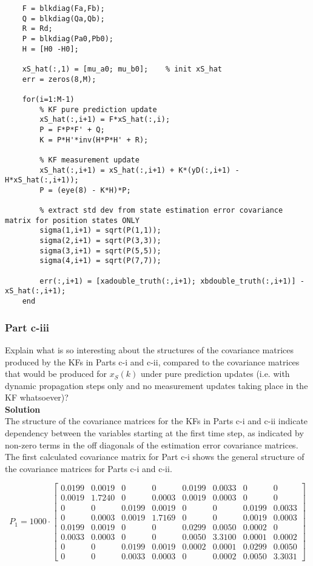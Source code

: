 \documentclass[]{article}
\begin{document}
\begin{lstlisting}
	F = blkdiag(Fa,Fb);
	Q = blkdiag(Qa,Qb);
	R = Rd;
	P = blkdiag(Pa0,Pb0);
	H = [H0 -H0];
	
	xS_hat(:,1) = [mu_a0; mu_b0];    % init xS_hat
	err = zeros(8,M);
	
	for(i=1:M-1)
		% KF pure prediction update
		xS_hat(:,i+1) = F*xS_hat(:,i);
		P = F*P*F' + Q;
		K = P*H'*inv(H*P*H' + R);
	
		% KF measurement update
		xS_hat(:,i+1) = xS_hat(:,i+1) + K*(yD(:,i+1) - H*xS_hat(:,i+1));
		P = (eye(8) - K*H)*P;
	
		% extract std dev from state estimation error covariance matrix for position states ONLY 
		sigma(1,i+1) = sqrt(P(1,1));
		sigma(2,i+1) = sqrt(P(3,3));
		sigma(3,i+1) = sqrt(P(5,5));
		sigma(4,i+1) = sqrt(P(7,7));
	
		err(:,i+1) = [xadouble_truth(:,i+1); xbdouble_truth(:,i+1)] - xS_hat(:,i+1);
	end
\end{lstlisting}

\subsubsection*{Part c-iii}

Explain what is so interesting about the structures of the covariance matrices produced by the KFs in Parts c-i and c-ii, compared to the covariance matrices that would be produced for $x_S(k)$ under pure prediction updates (i.e. with dynamic propagation steps only and no measurement updates taking place in the KF whatsoever)?\\

\noindent\textbf{Solution}\\

\noindent The structure of the covariance matrices for the KFs in Parts c-i and c-ii indicate dependency between the variables starting at the first time step, as indicated by non-zero terms in the off diagonals of the estimation error covariance matrices. The first calculated covariance matrix for Part c-i shows the general structure of the covariance matrices for Parts c-i and c-ii.

$$
P_1=1000\cdot\left[
\begin{array}{cccccccc}
0.0199  &  0.0019  &  0  &  0  &  0.0199  &  0.0033  &  0  &  0\\
0.0019  &  1.7240  & 0  &  0.0003  &  0.0019  &  0.0003  & 0  & 0\\
0 &  0  &  0.0199  &  0.0019  &  0  &  0  &   0.0199  &  0.0033\\
0 &  0.0003  &  0.0019  &  1.7169  &  0  &  0  &  0.0019  &  0.0003\\
0.0199  &  0.0019  &  0  &  0  &  0.0299  &  0.0050  &  0.0002  & 0\\
0.0033  &  0.0003  &  0  &  0  &  0.0050  &  3.3100  &  0.0001  &  0.0002\\
0 &  0  & 0.0199  &  0.0019  &  0.0002  &  0.0001  &  0.0299  &  0.0050\\
0 & 0  &  0.0033  &  0.0003  & 0  &  0.0002  &  0.0050  &  3.3031
\end{array}
\right]
$$\\
\end{document}

